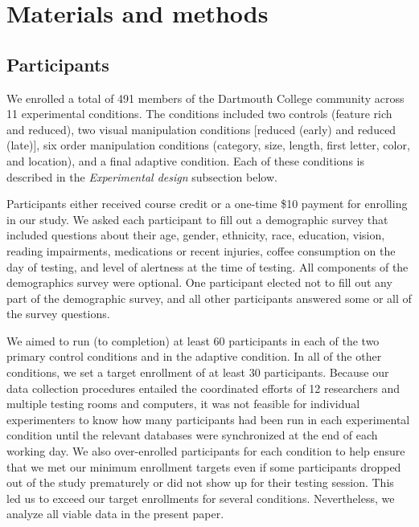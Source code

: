 \documentclass[11pt]{article}
\providecommand{\DIFaddend}{} %
\DeclareRobustCommand{\DIFaddend}{\DIFOaddend \let\includegraphics\DIFOincludegraphics} %
\begin{document}
\DIFaddend \section*{Materials and methods}

\subsection*{Participants}

We enrolled a total of 491 members of the Dartmouth College community across 11
experimental conditions. The conditions included two controls (feature rich and
reduced), two visual manipulation conditions [reduced (early) and reduced
(late)], six order manipulation conditions (category, size, length, first
letter, color, and location), and a final adaptive condition. Each of these
conditions is described in the \textit{Experimental design} subsection below.

Participants either received course credit or a one-time \$10 payment for
enrolling in our study. We asked each participant to fill out a demographic
survey that included questions about their age, gender, ethnicity, race,
education, vision, reading impairments, medications or recent injuries, coffee
consumption on the day of testing, and level of alertness at the time of
testing. All components of the demographics survey were optional. One
participant elected not to fill out any part of the demographic survey, and all
other participants answered some or all of the survey questions.

We aimed to run (to completion) at least 60 participants in each of the two
primary control conditions and in the adaptive condition. In all of the other
conditions, we set a target enrollment of at least 30 participants. Because our
data collection procedures entailed the coordinated efforts of 12 researchers
and multiple testing rooms and computers, it was not feasible for individual
experimenters to know how many participants had been run in each experimental
condition until the relevant databases were synchronized at the end of each
working day. We also over-enrolled participants for each condition to help
ensure that we met our minimum enrollment targets even if some participants
dropped out of the study prematurely or did not show up for their testing
session. This led us to exceed our target enrollments for several conditions.
Nevertheless, we analyze all viable data in the present paper.
\end{document}
